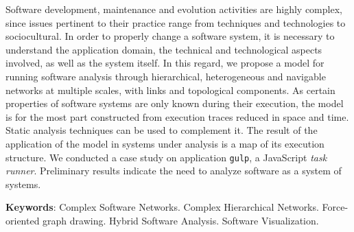 
%

\begin{resumo}[Abstract]
    Software development, maintenance and evolution activities are highly
	complex, since issues pertinent to their practice range from techniques and
	technologies to sociocultural.
	In order to properly change a software system, it is necessary to understand
	the application domain, the technical and technological aspects involved, as
	well as the system itself.
	In this regard, we propose a model for running software analysis through
	hierarchical, heterogeneous and navigable networks at multiple scales, with
	links and topological components.
	As certain properties of software systems are only known during their
	execution, the model is for the most part constructed from execution traces 
	reduced in space and time.
	Static analysis techniques can be used to complement it.
	The result of the application of the model in systems under analysis is a
	map of its execution structure.
	We conducted a case study on application \texttt{gulp}, a JavaScript
	\textit{task runner}.
	Preliminary results indicate the need to analyze software as a system of
	systems.

    \textbf{Keywords}: 
	Complex Software Networks.
	Complex Hierarchical Networks.
	Force-oriented graph drawing.
	Hybrid Software Analysis.
	Software Visualization.
\end{resumo}
